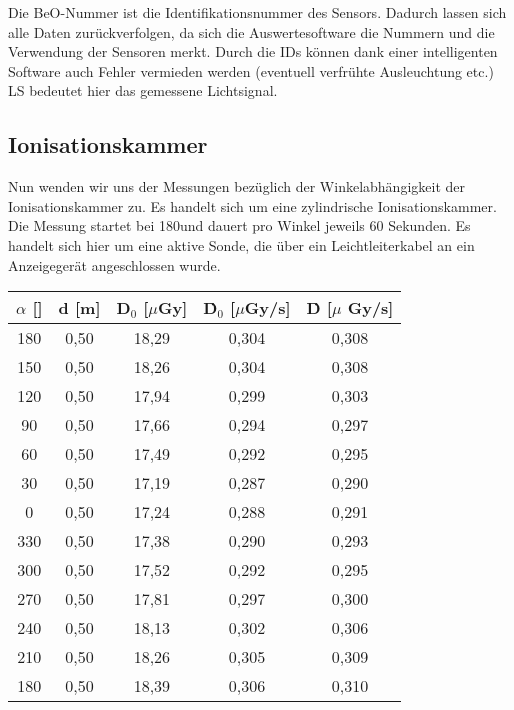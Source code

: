 Die BeO-Nummer ist die Identifikationsnummer des Sensors. Dadurch lassen sich alle Daten zurückverfolgen, da sich die Auswertesoftware die Nummern und die Verwendung der Sensoren merkt. Durch die IDs können dank einer intelligenten Software auch Fehler vermieden werden (eventuell verfrühte Ausleuchtung etc.) LS bedeutet hier das gemessene Lichtsignal.
		
\subsection{Ionisationskammer}

Nun wenden wir uns der Messungen bezüglich der Winkelabhängigkeit der Ionisationskammer zu. Es handelt sich um eine zylindrische Ionisationskammer. Die Messung startet bei 180\textdegree und dauert pro Winkel jeweils 60 Sekunden.
Es handelt sich hier um eine aktive Sonde, die über ein Leichtleiterkabel an ein Anzeigegerät angeschlossen wurde.

\vspace{5mm}
	\begin{center}
		\begin{tabular}{c|c|c|c|c}
				\textbf{$\alpha$} [\textdegree] & \textbf{d} [m] & \textbf{D$_0$} [$\mu$Gy] & \textbf{\.D$_0$} [$\mu$Gy/s] & \textbf{\.D} [$\mu$ Gy/s] \\ 
		\hline	180 & 0,50 & 18,29 & 0,304 & 0,308 \\ 
				150 & 0,50 & 18,26 & 0,304 & 0,308 \\ 
				120 & 0,50 & 17,94 & 0,299 & 0,303 \\ 
				90  & 0,50 & 17,66 & 0,294 & 0,297 \\ 
				60  & 0,50 & 17,49 & 0,292 & 0,295 \\ 
				30  & 0,50 & 17,19 & 0,287 & 0,290 \\ 
				0   & 0,50 & 17,24 & 0,288 & 0,291 \\ 
				330 & 0,50 & 17,38 & 0,290 & 0,293 \\ 
				300 & 0,50 & 17,52 & 0,292 & 0,295 \\ 
				270 & 0,50 & 17,81 & 0,297 & 0,300 \\ 
				240 & 0,50 & 18,13 & 0,302 & 0,306 \\ 
			    210 & 0,50 & 18,26 & 0,305 & 0,309 \\ 
		\hline	180 & 0,50 & 18,39 & 0,306 & 0,310 \\ 
		\end{tabular} 
		\label{dft:Winkel}
	\end{center}
\vspace{5mm}				

